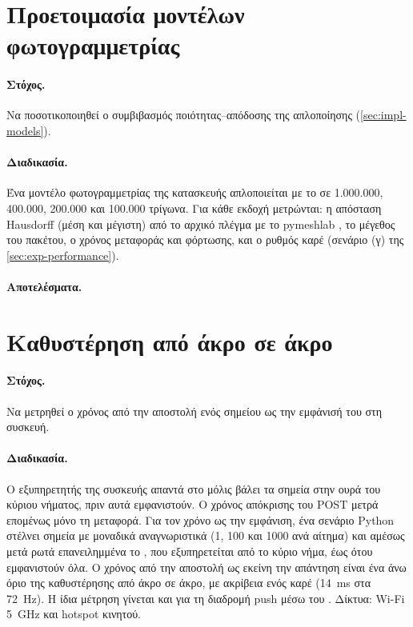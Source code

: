 \section{Προετοιμασία μοντέλων φωτογραμμετρίας}
\label{sec:exp-modelprep}

\paragraph{Στόχος.} Να ποσοτικοποιηθεί ο συμβιβασμός ποιότητας--απόδοσης της απλοποίησης (\cref{sec:impl-models}).

\paragraph{Διαδικασία.} Ένα μοντέλο φωτογραμμετρίας της κατασκευής απλοποιείται με το  σε 1.000.000, 400.000, 200.000 και 100.000 τρίγωνα. Για κάθε εκδοχή μετρώνται: η απόσταση Hausdorff (μέση και μέγιστη) από το αρχικό πλέγμα με το pymeshlab \cite{cignoni1998metro}, το μέγεθος του πακέτου, ο χρόνος μεταφοράς και φόρτωσης, και ο ρυθμός καρέ (σενάριο (γ) της \cref{sec:exp-performance}).

\paragraph{Αποτελέσματα.}\mbox{}


\section{Καθυστέρηση από άκρο σε άκρο}
\label{sec:exp-latency}

\paragraph{Στόχος.} Να μετρηθεί ο χρόνος από την αποστολή ενός σημείου ως την εμφάνισή του στη συσκευή.

\paragraph{Διαδικασία.} Ο εξυπηρετητής της συσκευής απαντά στο  μόλις βάλει τα σημεία στην ουρά του κύριου νήματος, πριν αυτά εμφανιστούν. Ο χρόνος απόκρισης του POST μετρά επομένως μόνο τη μεταφορά. Για τον χρόνο ως την εμφάνιση, ένα σενάριο Python στέλνει σημεία με μοναδικά αναγνωριστικά (1, 100 και 1000 ανά αίτημα) και αμέσως μετά ρωτά επανειλημμένα το , που εξυπηρετείται από το κύριο νήμα, έως ότου εμφανιστούν όλα. Ο χρόνος από την αποστολή ως εκείνη την απάντηση είναι ένα άνω όριο της καθυστέρησης από άκρο σε άκρο, με ακρίβεια ενός καρέ (\SI{14}{ms} στα \SI{72}{Hz}). Η ίδια μέτρηση γίνεται και για τη διαδρομή push μέσω του . Δίκτυα: Wi-Fi \SI{5}{GHz} και hotspot κινητού.

